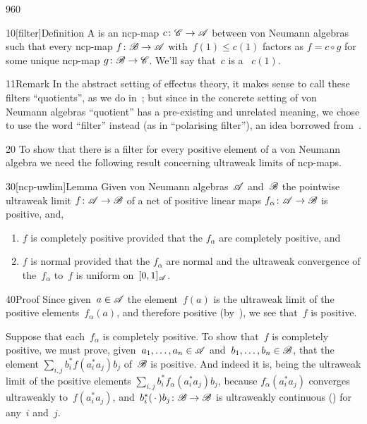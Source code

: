 \begin{parsec}{960}%
\begin{point}{10}[filter]{Definition}%
A %
is an ncp-map $c\colon \mathscr{C}\to\mathscr{A}$
between von Neumann algebras
such that every ncp-map $f\colon \mathscr{B}\to\mathscr{A}$
with~$f(1)\leq c(1)$
factors as $f=c\circ g$
for some unique ncp-map $g \colon \mathscr{B}\to\mathscr{C}$.
We'll say that~$c$ is a ~$c(1)$.
\begin{point}{11}{Remark}%
In the abstract setting of effectus theory,
it makes sense to call these filters
``quotients'', as we do in~\cite{cho2015quotient};
but since in the concrete setting of von Neumann algebras
``quotient'' has a pre-existing and unrelated meaning,
we chose to use the word ``filter'' instead (as in ``polarising filter''),
an idea borrowed from~\cite{wilce2016royal}.
\end{point}
\end{point}
\begin{point}{20}%
To show that there is a filter
for every positive element of a von Neumann algebra
we need the following result
concerning ultraweak limits of ncp-maps.
\end{point}
\begin{point}{30}[ncp-uwlim]{Lemma}%
Given von Neumann algebras~$\mathscr{A}$
and~$\mathscr{B}$
the pointwise ultraweak limit
$f\colon \mathscr{A}\to\mathscr{B}$
of a net of  positive linear maps $f_\alpha\colon \mathscr{A}\to\mathscr{B}$
is positive, and, 
\begin{enumerate}
\item
$f$ is completely positive provided
that the $f_\alpha$ are completely positive, and
\item
$f$ is normal provided that the $f_\alpha$ are normal
and the ultraweak convergence of the~$f_\alpha$ to~$f$
is uniform on~$[0,1]_{\mathscr{A}}$.
\end{enumerate}
\spacingfix%
\begin{point}{40}{Proof}%
Since given~$a\in \mathscr{A}$ the element~$f(a)$
is the ultraweak limit of the positive elements~$f_\alpha(a)$,
and therefore positive (by~),
we see that~$f$ is positive.

Suppose that each~$f_\alpha$ is completely positive.
To show that~$f$ is completely positive,
we must prove, given~$a_1,\dotsc,a_n\in\mathscr{A}$
and~$b_1,\dotsc,b_n\in\mathscr{B}$,
that 
the element $\sum_{i,j} b_i^* f(a_i^*a_j)b_j$
of~$\mathscr{B}$
is positive.
And indeed it is,
being the ultraweak limit of
the positive elements $\sum_{i,j} b_i^* f_\alpha (a_i^* a_j)b_j$,
because  $f_\alpha(a_i^* a_j)$
converges ultraweakly to~$f(a_i^* a_j)$,
and~$b_i^*(\,\cdot\,)b_j\colon \mathscr{B}\to\mathscr{B}$
is ultraweakly continuous
()
for any~$i$ and~$j$.


\end{point}
\end{point}
\end{parsec}
